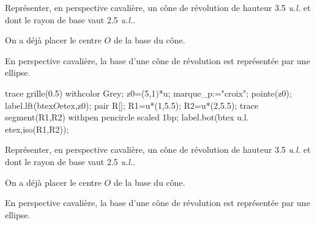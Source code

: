 \begin{exercice*}
    Représenter, en perspective cavalière, un cône de révolution de hauteur \num{3.5} \textit{u.l.} et dont le rayon de base vaut \num{2.5} \textit{u.l.}.

    On a déjà placer le centre $O$ de la base du cône.

    En perspective cavalière, la base d'une cône de révolution est représentée par une ellipse.
    \begin{center}
        \begin{Geometrie}[CoinHD={(10u,6u)}]
            trace grille(0.5) withcolor Grey;
            z0=(5,1)*u;
            marque_p:="croix";
            pointe(z0);
            label.lft(btex$O$etex,z0);
            pair R[];
            R1=u*(1,5.5);
            R2=u*(2,5.5);
            trace segment(R1,R2) withpen pencircle scaled 1bp;
            label.bot(btex u.l. etex,iso(R1,R2));
        \end{Geometrie}
    \end{center}
\end{exercice*}
\begin{corrige}
    Représenter, en perspective cavalière, un cône de révolution de hauteur \num{3.5} \textit{u.l.} et dont le rayon de base vaut \num{2.5} \textit{u.l.}.

    On a déjà placer le centre $O$ de la base du cône.

    En perspective cavalière, la base d'une cône de révolution est représentée par une ellipse.
    \begin{center}
        \scalebox{0.8}{
            \Solide[%
                Nom=cone,
                RayonCone=1.25,
                HauteurCone=1.75,
                ListeSommets={S,O},
                Phi=0,        
                Traces={%
                for i=-4 upto 10:
                trace segment((0,-2.5,i*0.25),(0,2.5,i*.25)) withcolor Grey;
                endfor;
                for i=-10 upto 10:
                trace segment((0,i*0.25,-1),(0,i*.25,2.5)) withcolor Grey;
                endfor;
                Label.llft(btex O etex,O);
                Label.urt(btex S etex,S);
                color D;
                D-O=rayoncone*(cosd(30),sind(30),0);
                trace codeperp(S,O,D,5) withpen pencircle scaled 1bp;
                trace segment(S,O) withpen pencircle scaled 1bp dashed evenly;
                trace segment(D,O) withpen pencircle scaled 1bp dashed evenly;
                marque_p:="croix";
                u:=u*0.5;
                pointe(O);
                u:=u*2;
                color R[];
                R1=(0,-1.75,2.25);
                R2=(0,-1.25,2.25);
                trace segment(R1,R2) withpen pencircle scaled 1bp;
                Label.bot(btex u.l. etex,iso(R1,R2));
                }
            ]
        }
    \end{center}
\end{corrige}


